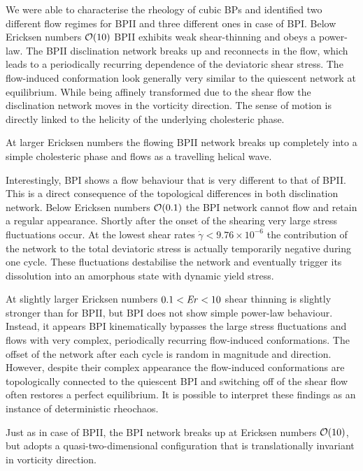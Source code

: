 \documentclass[aps,pre,reprint,superscriptaddress, twocolumn]{revtex4}
\newcommand{\e}[1]{\times10^{#1}}
\newcommand{\gd}{\dot{\gamma}}
\begin{document}
We were able to characterise the rheology of cubic BPs and identified 
two different flow regimes for BPII and three different ones in case of BPI. 
Below Ericksen numbers ${\cal O}(10)$ BPII exhibits weak shear-thinning and 
obeys a power-law.  The BPII disclination network breaks up and reconnects 
in the flow, which leads to a periodically recurring dependence 
of the deviatoric shear stress. The flow-induced conformation look generally
very similar to the quiescent network at equilibrium. 
While being affinely transformed due to the shear flow
the disclination network moves in the vorticity direction. The sense of
motion is directly linked to the helicity of the underlying cholesteric phase.

At larger Ericksen numbers the flowing BPII network breaks up completely into 
a simple cholesteric phase and flows as a travelling helical wave. 

Interestingly, BPI shows a flow behaviour that is very different to that of BPII.
This is a direct consequence of the topological differences in both disclination 
network. Below Ericksen numbers ${\cal O}(0.1)$ the BPI network cannot flow and 
retain a regular appearance. Shortly after the onset of the shearing 
very large stress fluctuations occur. At the lowest shear rates $\gd<9.76\e{-6}$
the contribution of the network to the total deviatoric stress is actually temporarily 
negative during one cycle. These fluctuations destabilise the network and 
eventually trigger its dissolution into an amorphous state with 
dynamic yield stress.

At slightly larger Ericksen numbers $0.1<{\it Er}<10$ shear thinning is 
slightly stronger than for BPII, but BPI does not show simple power-law 
behaviour. 
Instead, it appears BPI kinematically bypasses the large stress fluctuations and 
flows with very complex, periodically recurring flow-induced conformations.
The offset of the network after each cycle is random in magnitude and direction.
However, despite their complex appearance the flow-induced conformations are 
topologically connected to the quiescent BPI and switching off of the 
shear flow often restores a perfect equilibrium.
It is possible to interpret these findings as an instance of 
deterministic rheochaos.

Just as in case of BPII, the BPI network breaks up at Ericksen numbers ${\cal O}(10)$,
but adopts a quasi-two-dimensional configuration that is translationally 
invariant in vorticity direction.  

\end{document}
